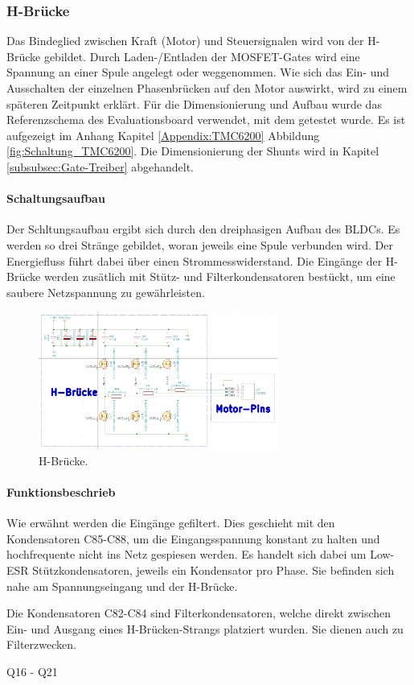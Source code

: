 \subsubsection{H-Brücke}
\label{subsubsec:H-Brücke}

Das Bindeglied zwischen Kraft (Motor) und Steuersignalen wird von der H-Brücke gebildet. Durch Laden-/Entladen der MOSFET-Gates wird eine Spannung an einer Spule angelegt oder weggenommen. Wie sich das Ein- und Ausschalten der einzelnen Phasenbrücken auf den Motor auswirkt, wird zu einem späteren Zeitpunkt erklärt. Für die Dimensionierung und Aufbau wurde das Referenzschema des Evaluationsboard verwendet, mit dem getestet wurde. Es ist aufgezeigt im Anhang Kapitel \ref{Appendix:TMC6200} Abbildung \ref{fig:Schaltung_TMC6200}. Die Dimensionierung der Shunts wird in Kapitel \ref{subsubsec:Gate-Treiber} abgehandelt.

\paragraph{Schaltungsaufbau}\mbox{}

Der Schltungsaufbau ergibt sich durch den dreiphasigen Aufbau des BLDCs. Es werden so drei Stränge gebildet, woran jeweils eine Spule verbunden wird. Der Energiefluss führt dabei über einen Strommesswiderstand. Die Eingänge der H-Brücke werden zusätlich mit Stütz- und Filterkondensatoren bestückt, um eine saubere Netzspannung zu gewährleisten.

\begin{figure}[h!]
	\centering
	\includegraphics[width=0.7\textwidth]{graphics/Schema_H_Bruecke_und_BLDC}
	\caption{H-Brücke.}
	\label{fig:Schema_H_Bruecke_und_BLDC}
\end{figure}

\newpage

\paragraph{Funktionsbeschrieb}\mbox{}

Wie erwähnt werden die Eingänge gefiltert. Dies geschieht mit den Kondensatoren C85-C88, um die Eingangsspannung konstant zu halten und hochfrequente nicht ins Netz gespiesen werden.
Es handelt sich dabei um Low-ESR Stützkondensatoren, jeweils ein Kondensator pro Phase.
Sie befinden sich nahe am Spannungseingang und der H-Brücke.

Die Kondensatoren C82-C84 sind Filterkondensatoren, welche direkt zwischen Ein- und Ausgang eines H-Brücken-Strangs platziert wurden.
Sie dienen auch zu Filterzwecken.

Q16 - Q21